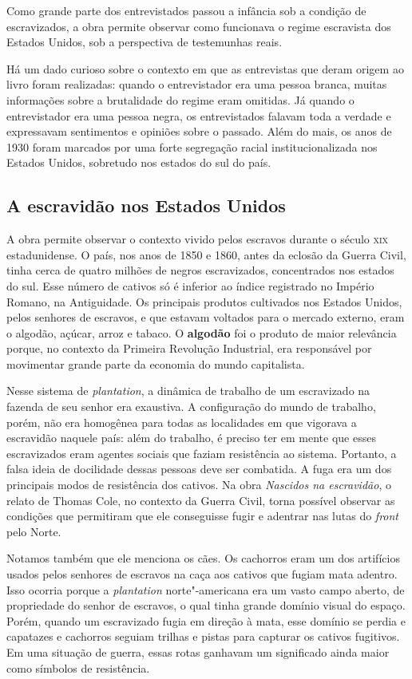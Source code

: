 \documentclass[12pt]{extarticle}
\begin{document}
Como grande parte dos entrevistados passou a infância sob a condição de
escravizados, a obra permite observar como funcionava o regime
escravista dos Estados Unidos, sob a perspectiva de testemunhas reais.

Há um dado curioso sobre o contexto em que as entrevistas que deram
origem ao livro foram realizadas: quando o entrevistador era uma pessoa
branca, muitas informações sobre a brutalidade do regime eram omitidas.
Já quando o entrevistador era uma pessoa negra, os entrevistados falavam
toda a verdade e expressavam sentimentos e opiniões sobre o passado.
Além do mais, os anos de 1930 foram marcados por uma forte segregação
racial institucionalizada nos Estados Unidos, sobretudo nos estados do
sul do país.

\subsection{A escravidão nos Estados Unidos}

A obra permite observar o contexto vivido pelos escravos durante o
século \textsc{xix} estadunidense. O país, nos anos de 1850 e 1860, antes da
eclosão da Guerra Civil, tinha cerca de quatro milhões de negros
escravizados, concentrados nos estados do sul. Esse número de cativos só
é inferior ao índice registrado no Império Romano, na Antiguidade. Os
principais produtos cultivados nos Estados Unidos, pelos senhores de
escravos, e que estavam voltados para o mercado externo, eram o algodão,
açúcar, arroz e tabaco. O \textbf{algodão} foi o produto de maior
relevância porque, no contexto da Primeira Revolução Industrial, era
responsável por movimentar grande parte da economia do mundo
capitalista.

Nesse sistema de \emph{plantation}, a dinâmica de trabalho de um
escravizado na fazenda de seu senhor era exaustiva. A configuração do
mundo de trabalho, porém, não era homogênea para todas as localidades em
que vigorava a escravidão naquele país: além do trabalho, é preciso ter
em mente que esses escravizados eram agentes sociais que faziam
resistência ao sistema. Portanto, a falsa ideia de docilidade dessas
pessoas deve ser combatida. A fuga era um dos principais modos de
resistência dos cativos. Na obra \emph{Nascidos na escravidão}, o relato
de Thomas Cole, no contexto da Guerra Civil, torna possível observar as
condições que permitiram que ele conseguisse fugir e adentrar nas lutas
do \emph{front} pelo Norte.

Notamos também que ele menciona os cães. Os cachorros eram um dos
artifícios usados pelos senhores de escravos na caça aos cativos que
fugiam mata adentro. Isso ocorria porque a \emph{plantation}
norte"-americana era um vasto campo aberto, de propriedade do senhor de
escravos, o qual tinha grande domínio visual do espaço. Porém, quando um
escravizado fugia em direção à mata, esse domínio se perdia e capatazes
e cachorros seguiam trilhas e pistas para capturar os cativos fugitivos.
Em uma situação de guerra, essas rotas ganhavam um significado ainda
maior como símbolos de resistência.
\end{document}
